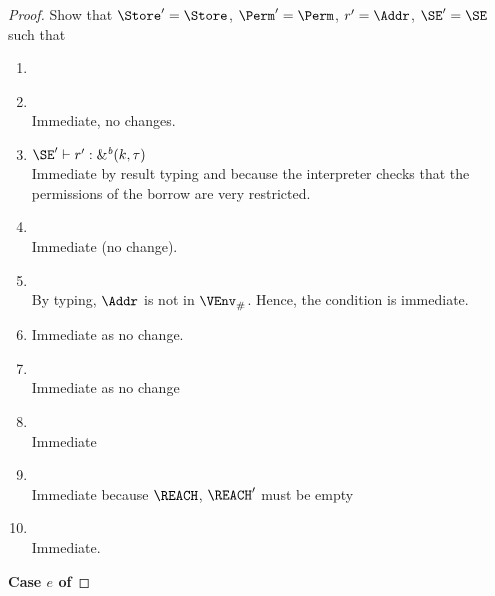 \begin{proof}
  Show that $\Store' = \Store$, $\Perm' = \Perm$, $r' = \Addr$, $\SE'
  = \SE$ such that
  \begin{enumerate}[({R}1)]
  \item {}
  \item {} \\
    Immediate, no changes.
  \item $\SE' \vdash r' : \borrowty{k}{\tau}$\\
    Immediate by result typing and because the interpreter checks that
    the permissions of the borrow are very restricted.
  \item {}\\
    Immediate (no change).
  \item {} \\
    By typing, $\Addr$ is not in $\Suspended\VEnv$.
    Hence,  the condition is immediate.
  \item {} 
    Immediate as no change.
  \item {}\\
    Immediate as no change
  \item {} \\
    Immediate
  \item {} \\
    Immediate because $\REACH$, $\REACH'$ must be empty
  \item {}\\
    Immediate.
  \end{enumerate}

  \newpage
  \textbf{Case $e$ of}


\end{proof}
